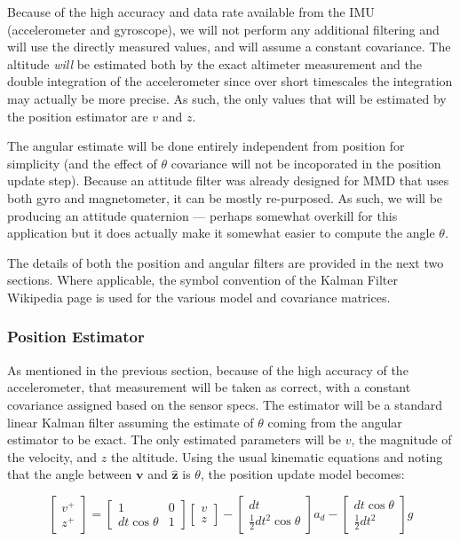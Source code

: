 \documentclass{article}
\renewcommand{\vec}{\boldsymbol} %
\newcommand{\uvec}[1]{\vec{\hat{#1}}}
\newcommand{\bmat}[1]{\begin{bmatrix} #1 \end{bmatrix}}
\begin{document}
	Because of the high accuracy and data rate available from the IMU (accelerometer and gyroscope), we will not perform any additional filtering and will use the directly measured values, and will assume a constant covariance.  The altitude \textit{will} be estimated both by the exact altimeter measurement and the double integration of the accelerometer since over short timescales the integration may actually be more precise.  As such, the only values that will be estimated by the position estimator are $v$ and $z$.
	
	The angular estimate will be done entirely independent from position for simplicity (and the effect of $\theta$ covariance will not be incoporated in the position update step).  Because an attitude filter was already designed for MMD that uses both gyro and magnetometer, it can be mostly re-purposed.  As such, we will be producing an attitude quaternion --- perhaps somewhat overkill for this application but it does actually make it somewhat easier to compute the angle $\theta$.
	
	The details of both the position and angular filters are provided in the next two sections.  Where applicable, the symbol convention of the Kalman Filter Wikipedia page is used for the various model and covariance matrices.
	
	\subsubsection{Position Estimator}
	
	As mentioned in the previous section, because of the high accuracy of the accelerometer, that measurement will be taken as correct, with a constant covariance assigned based on the sensor specs.  The estimator will be a standard linear Kalman filter assuming the estimate of $\theta$ coming from the angular estimator to be exact.  The only estimated parameters will be $v$, the magnitude of the velocity, and $z$ the altitude.  Using the usual kinematic equations and noting that the angle between $\vec{v}$ and $\uvec{z}$ is $\theta$, the position update model becomes: 
	
	\begin{equation}
		\bmat{v^+\\z^+} = \bmat{1&0\\dt\cos\theta&1}\bmat{v\\z} - \bmat{dt\\\frac{1}{2}dt^2\cos\theta}a_d - \bmat{dt\cos\theta\\\frac{1}{2}dt^2}g
	\end{equation}
	
\end{document}
